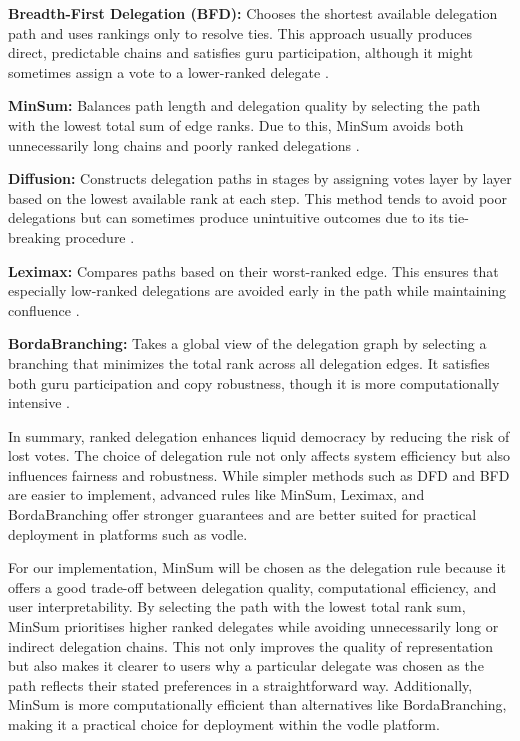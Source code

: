 \textbf{Breadth-First Delegation (BFD):} Chooses the shortest available delegation path and uses rankings only to resolve ties. This approach usually produces direct, predictable chains and satisfies guru participation, although it might sometimes assign a vote to a lower-ranked delegate \citep{kotsialou_riley_2020, brill_liquid_2022}.

\textbf{MinSum:} Balances path length and delegation quality by selecting the path with the lowest total sum of edge ranks. Due to this, MinSum avoids both unnecessarily long chains and poorly ranked delegations \citep{brill_liquid_2022}.

\textbf{Diffusion:} Constructs delegation paths in stages by assigning votes layer by layer based on the lowest available rank at each step. This method tends to avoid poor delegations but can sometimes produce unintuitive outcomes due to its tie-breaking procedure \citep{brill_liquid_2022}.

\textbf{Leximax:} Compares paths based on their worst-ranked edge. This ensures that especially low-ranked delegations are avoided early in the path while maintaining confluence \citep{brill_liquid_2022}.

\textbf{BordaBranching:} Takes a global view of the delegation graph by selecting a branching that minimizes the total rank across all delegation edges. It satisfies both guru participation and copy robustness, though it is more computationally intensive \citep{brill_liquid_2022}.

In summary, ranked delegation enhances liquid democracy by reducing the risk of lost votes. The choice of delegation rule not only affects system efficiency but also influences fairness and robustness. While simpler methods such as DFD and BFD are easier to implement, advanced rules like MinSum, Leximax, and BordaBranching offer stronger guarantees and are better suited for practical deployment in platforms such as vodle.

For our implementation, MinSum will be chosen as the delegation rule because it offers a good trade-off between delegation quality, computational efficiency, and user interpretability. By selecting the path with the lowest total rank sum, MinSum prioritises higher ranked delegates while avoiding unnecessarily long or indirect delegation chains. This not only improves the quality of representation but also makes it clearer to users why a particular delegate was chosen as the path reflects their stated preferences in a straightforward way. Additionally, MinSum is more computationally efficient than alternatives like BordaBranching, making it a practical choice for deployment within the vodle platform.


